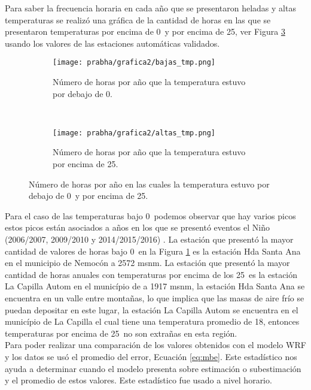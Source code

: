 
Para saber la frecuencia horaria en cada año que se presentaron heladas y altas temperaturas se realizó una gráfica de la cantidad de horas en las que se presentaron temperaturas por encima de 0\celc\ y por encima de 25\celc, ver Figura \ref{subfig:temp_horarias_ext} usando los valores de las estaciones automáticas validados.\\

\begin{figure}[H]
    \centering
    \begin{subfigure}[b]{0.45\textwidth}
	\texttt{[image: prabha/grafica2/bajas\_tmp.png]}
    \caption{Número de horas por año que la temperatura estuvo por debajo de 0\celc.}
    \label{subfig:tmp_0}
	\end{subfigure}
	~
    \begin{subfigure}[b]{0.45\textwidth}
	\texttt{[image: prabha/grafica2/altas\_tmp.png]}
    \caption{Número de horas por año que la temperatura estuvo por encima de 25\celc.}
    \label{subfig:tmp_25}
	\end{subfigure}

\caption{Número de horas por año en las cuales la temperatura estuvo por debajo de 0\celc\ y por encima de 25\celc.}	
\label{subfig:temp_horarias_ext}	
\end{figure}

Para el caso de las temperaturas bajo 0\celc\ podemos observar que hay varios picos estos picos están asociados a años en los que se presentó eventos el Niño (2006/2007, 2009/2010 y 2014/2015/2016) \citep{NOAA-ORI}. La estación que presentó la mayor cantidad de valores de horas bajo 0\celc\ en la Figura \ref{subfig:tmp_0} es la estación Hda Santa Ana en el municipio de Nemocón a 2572 msnm. La estación que presentó la mayor cantidad de horas anuales con temperaturas por encima de los 25\celc\ es la estación La Capilla Autom en el município de a 1917 msnm, la estación Hda Santa Ana se encuentra en un valle entre montañas, lo que implica que las masas de aire frío se puedan depositar en este lugar, la estación La Capilla Autom se encuentra en el município de La Capilla el cual tiene una temperatura promedio de 18\celc, entonces temperaturas por encima de 25\celc\ no son extrañas en esta región.\\

Para poder realizar una comparación de los valores obtenidos con el modelo WRF y los datos se usó el promedio del error, Ecuación \ref{eq:mbe}. Este estadístico nos ayuda a determinar cuando el modelo presenta sobre estimación o subestimación y el promedio de estos valores. Este estadístico fue usado a nivel horario.

